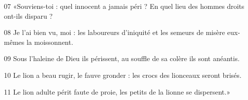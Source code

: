 
07 «Souviens-toi : quel innocent a jamais péri ? En quel lieu des hommes droits ont-ils disparu ?

08 Je l’ai bien vu, moi : les laboureurs d’iniquité et les semeurs de misère eux-mêmes la moissonnent.

09 Sous l’haleine de Dieu ils périssent, au souffle de sa colère ils sont anéantis.

10 Le lion a beau rugir, le fauve gronder : les crocs des lionceaux seront brisés.

11 Le lion adulte périt faute de proie, les petits de la lionne se dispersent.»
